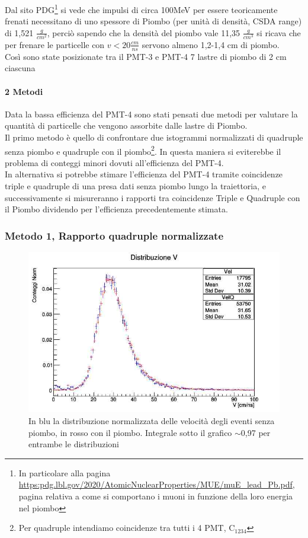 \documentclass[a4paper]{article}
\begin{document}
Dal sito PDG\footnote{In particolare alla pagina \url{https:pdg.lbl.gov/2020/AtomicNuclearProperties/MUE/muE_lead_Pb.pdf}, pagina relativa a come si comportano i muoni in funzione della loro energia nel piombo} si vede che impulsi di circa 100MeV per essere teoricamente frenati necessitano di uno spessore di Piombo (per unità di densità, CSDA range) di 1,521 $\frac{g}{cm^2}$, perciò sapendo che la densità del piombo vale 11,35 $\frac{g}{cm^3}$ si ricava che per frenare le particelle con $v<20\frac{cm}{ns}$ servono almeno 1,2-1,4 cm di piombo.\\
Così sono state posizionate tra il PMT-3 e PMT-4 7 lastre di piombo di 2 cm ciascuna

\paragraph{2 Metodi}
Data la bassa efficienza del PMT-4 sono stati pensati due metodi per valutare la quantità di particelle che vengono assorbite dalle lastre di Piombo.\\
Il primo metodo è quello di confrontare due istogrammi normalizzati di quadruple senza piombo e quadruple con il piombo\footnote{Per quadruple intendiamo coincidenze tra tutti i 4 PMT, C$_{1234}$}. In questa maniera si eviterebbe il problema di conteggi minori dovuti all'efficienza del PMT-4.\\
In alternativa si potrebbe stimare l'efficienza del PMT-4 tramite coincidenze triple e quadruple di una presa dati senza piombo lungo la traiettoria, e successivamente si misureranno i rapporti tra coincidenze Triple e Quadruple con il Piombo dividendo per l'efficienza precedentemente stimata.

\subsubsection*{Metodo 1, Rapporto quadruple normalizzate}

\begin{figure}[H]
\centering
\includegraphics[scale=0.3]{./immagini/TimeOfFlight/VNormForeQuadruple.jpg}
\caption{In blu la distribuzione normalizzata delle velocità degli eventi senza piombo, in rosso con il piombo. Integrale sotto il grafico $\sim$0,97 per entrambe le distribuzioni}
\label{fig:VNormFore}
\end{figure}
\end{document}
